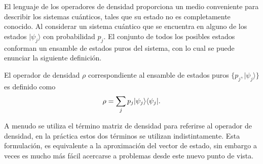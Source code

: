 El lenguaje de los operadores de densidad proporciona un  medio conveniente
para describir los sistemas cuánticos, tales que su estado no es completamente
conocido. Al considerar un sistema cuántico que se encuentra en alguno de los
estados $|\psi_j \rangle $ con probabilidad $p_j$. El conjunto de todos los
posibles estados conforman un ensamble de estados puros del sistema, con lo
cual se puede enunciar la siguiente definición. 

\begin{definition} El operador de densidad
$\rho$ correspondiente al ensamble de estados puros $\{p_j,|\psi_j \rangle \}$
es definido como {\cite{wilde2011classical}}
  	\begin{equation}{\label{defdensityoperator}}
  		\rho=\sum_{j}p_j|\psi_j\rangle \langle \psi_j|.
  	\end{equation}
\end{definition}
A menudo se utiliza el término matriz de densidad para referirse al operador de
densidad, en la práctica estos dos términos se utilizan indistintamente. Esta
formulación, es equivalente a la aproximación del vector de estado, sin embargo
a veces es mucho más fácil acercarse a problemas desde este nuevo punto de
vista.
 
